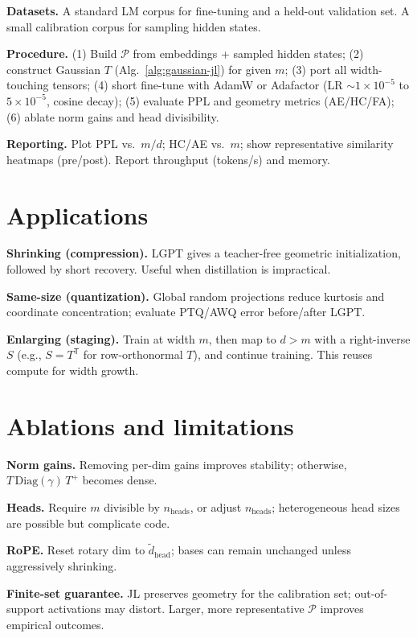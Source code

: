 \documentclass{article}
\newcommand{\Trans}{\mathsf{T}}
\begin{document}
\noindent\textbf{Datasets.} A standard LM corpus for fine-tuning and a held-out
validation set. A small calibration corpus for sampling hidden states.

\noindent\textbf{Procedure.} (1) Build $\mathcal{P}$ from embeddings + sampled
hidden states; (2) construct Gaussian $T$ (Alg.~\ref{alg:gaussian-jl}) for given
$m$; (3) port all width-touching tensors; (4) short fine-tune with AdamW or
Adafactor (LR $\sim\!1\!\times\!10^{-5}$ to $5\!\times\!10^{-5}$, cosine decay);
(5) evaluate PPL and geometry metrics (AE/HC/FA); (6) ablate norm gains and
head divisibility.

\noindent\textbf{Reporting.} Plot PPL vs.\ $m/d$; HC/AE vs.\ $m$; show representative
similarity heatmaps (pre/post). Report throughput (tokens/s) and memory.

\section{Applications}
\label{sec:applications}
\textbf{Shrinking (compression).} LGPT gives a teacher-free geometric
initialization, followed by short recovery. Useful when distillation is impractical.

\noindent\textbf{Same-size (quantization).} Global random projections reduce
kurtosis and coordinate concentration; evaluate PTQ/AWQ error before/after LGPT.

\noindent\textbf{Enlarging (staging).} Train at width $m$, then map to $d>m$
with a right-inverse $S$ (e.g., $S=T^\Trans$ for row-orthonormal $T$), and
continue training. This reuses compute for width growth.

\section{Ablations and limitations}
\label{sec:ablations}
\textbf{Norm gains.} Removing per-dim gains improves stability; otherwise,
$T\,\mathrm{Diag}(\gamma)\,T^+$ becomes dense.

\noindent\textbf{Heads.} Require $m$ divisible by $n_\text{heads}$, or adjust
$n_\text{heads}$; heterogeneous head sizes are possible but complicate code.

\noindent\textbf{RoPE.} Reset rotary dim to $\tilde{d}_\text{head}$; bases can
remain unchanged unless aggressively shrinking.

\noindent\textbf{Finite-set guarantee.} JL preserves geometry for the calibration
set; out-of-support activations may distort. Larger, more representative $\mathcal{P}$
improves empirical outcomes.
\end{document}
